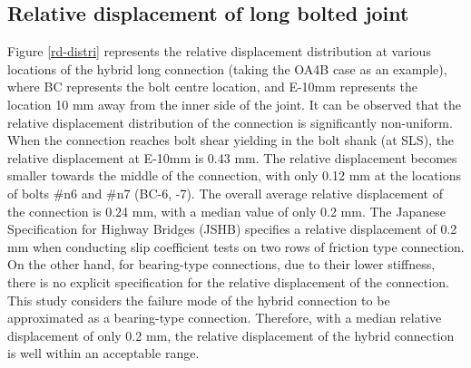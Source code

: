 \subsection{Relative displacement of long bolted joint}

Figure \ref{rd-distri} represents the relative displacement distribution at various locations of the hybrid long connection (taking the OA4B case as an example), where BC represents the bolt centre location, and E-10mm represents the location 10 mm away from the inner side of the joint. It can be observed that the relative displacement distribution of the connection is significantly non-uniform. When the connection reaches bolt shear yielding in the bolt shank (at SLS), the relative displacement at E-10mm is 0.43 mm. The relative displacement becomes smaller towards the middle of the connection, with only 0.12 mm at the locations of bolts \#n6 and \#n7 (BC-6, -7). The overall average relative displacement of the connection is 0.24 mm, with a median value of only 0.2 mm. The Japanese Specification for Highway Bridges (JSHB) \cite{douji2017} specifies a relative displacement of 0.2 mm when conducting slip coefficient tests on two rows of friction type connection. On the other hand, for bearing-type connections, due to their lower stiffness, there is no explicit specification for the relative displacement of the connection. This study considers the failure mode of the hybrid connection to be approximated as a bearing-type connection. Therefore, with a median relative displacement of only 0.2 mm, the relative displacement of the hybrid connection is well within an acceptable range.


